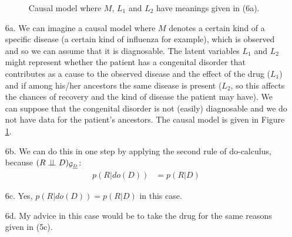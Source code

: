 \documentclass{amsmlaj}
\begin{document}
\begin{sol}
\begin{itemize}
\begin{figure}[h]
			\caption{Causal model where $M$, $L_1$ and $L_2$ have meanings given in (6a).}
			\label{fig:p3iii}
		\end{figure}
		\item[6a.] We can imagine a causal model where $M$ denotes a certain kind of
			a specific disease (a certain kind of influenza for example), which is
			observed and so we can assume that it is diagnosable. The latent variables
			$L_1$ and $L_2$ might represent whether the patient has a congenital
			disorder that contributes as a cause to the observed disease and the effect
			of the drug ($L_1$) and if among his/her ancestors the same disease is
			present ($L_2$, so this affects the chances of recovery and the kind of
			disease the patient may have). We can suppose that the congenital disorder is not
			(easily) diagnosable and we do not have data for the patient's ancestors.
			The causal model is given in Figure \ref{fig:p3iii}.
		\item[6b.] We can do this in one step by applying the second rule of
			do-calculus, because $(R \perp\!\!\!\perp D)_{\mathcal{G}_{\underline{D}}}$:
			\begin{align}
				p(R|do(D)) &= p(R|D)
			\end{align}
		\item[6c.] Yes, $p(R|do(D)) = p(R|D)$ in this case.
		\item[6d.] My advice in this case would be to take the drug for the same
			reasons given in (5c).
	\end{itemize}
\end{sol}

\newpage
\end{document}
